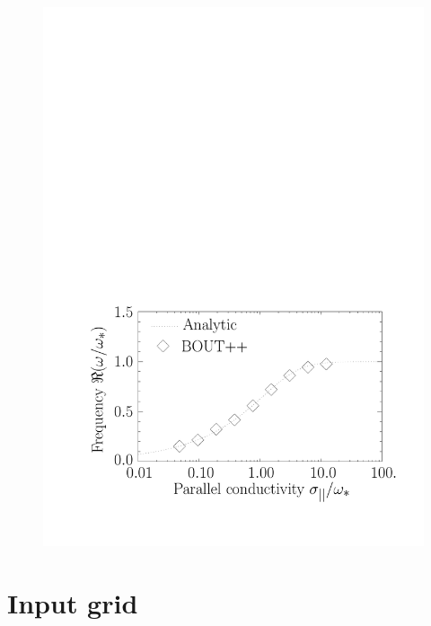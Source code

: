 \documentclass[12pt]{article}
\begin{document}
\begin{figure}[htbp!]
{  \includegraphics[scale=0.35]{drift_freq.pdf}
}
\end{figure}

\section{Input grid}
\end{document}
